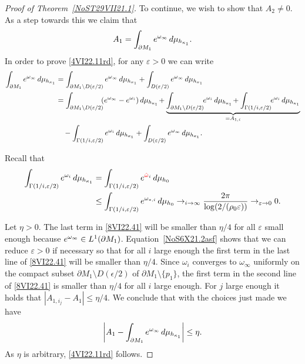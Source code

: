 \documentclass[10pt,a4paper]{article}
\numberwithin{equation}{section}
\newcommand{\hmv}{\red{\hat \omega}}
\newcommand{\mv}{\omega}%
\newcommand{\red}[1]{{\color{red}#1}}
\newcommand{\repsilon}{ {\varepsilon}}
\begin{document}
\begin{proof}[Proof of Theorem~\ref{NoST29VII21.1}]
To continue, we wish to show that $A_2\ne 0$. As a step towards this we claim that
\begin{equation}\label{4VI22.11rd}
 A_1 = \int_{\partial M_1} {\rm e}^{\mv_\infty}\, {\rm d}\mu_{h_{\kappa_1} }.
\end{equation}
In order to prove \eqref{4VI22.11rd}, for any $\repsilon>0$ we can write
\begin{align}
 \int_{\partial M_1} {\rm e}^{\mv_\infty}\, {\rm d}\mu_{h_{\kappa_1} }
 &=
 \int_{\partial M_1\setminus D(\repsilon/2)} {\rm e}^{\mv_\infty}\, {\rm d}\mu_{h_{\kappa_1} }
 +
 \int_{ D(\repsilon/2)} {\rm e}^{\mv_\infty} \,{\rm d}\mu_{h_{\kappa_1} }
 \nonumber
\\
 &=
 \int_{\partial M_1\setminus D(\repsilon/2)}\!\! ( {\rm e}^{\mv_\infty} - {\rm e}^{\mv_i} )\, {\rm d}\mu_{h_{\kappa_1} }\!
 +
 \underbrace{
 \int_{\partial M_1\setminus D(\repsilon/2)}\!\! {\rm e}^{\mv_i}\, {\rm d}\mu_{h_{\kappa_1} }\!
 +
 \int_{\Gamma(1/i,\repsilon/2) }\!\! {\rm e}^{\mv_i}\, {\rm d}\mu_{h_{\kappa_1}}
 }_{=A_{1,i}}
 \nonumber
\\
&\quad{}
 -
 \int_{\Gamma(1/i,\repsilon/2) } {\rm e}^{\mv_i}\, {\rm d}\mu_{h_{\kappa_1}}
 +
 \int_{ D(\repsilon/2)} {\rm e}^{\mv_\infty}\, {\rm d}\mu_{h_{\kappa_1} }. \label{8VI22.41}
\end{align}

Recall that
\begin{align}
 \int_{\Gamma(1/i,\repsilon/2) } {\rm e}^{\mv_i}\, {\rm d}\mu_{h_{\kappa_1}}
 & =
 \int_{\Gamma(1/i,\repsilon/2) } {\rm e}^{\hmv_i}\, {\rm d}\mu_{h_0}
\nonumber
\\
 &\le
 \int_{\Gamma(1/i,\repsilon/2) } {\rm e}^{\mv_{*,i} } \,{\rm d}\mu_{h_0}
 \to_{i\to\infty}
 \frac{2\pi }{\log (2/(\rho_0\repsilon))}
 \to_{\repsilon\to 0}
 0. \label{NoS6X21.2asf}
\end{align}

Let $\eta>0$. The last term in \eqref{8VI22.41} will be smaller than $\eta/4$ for all $\varepsilon$ small enough because ${\rm e}^{\omega_\infty}\in L^1(\partial M_1)$. Equation~\eqref{NoS6X21.2asf} shows that we can reduce $\varepsilon >0$ if necessary so that for all $i$ large enough the first term in the last line of \eqref{8VI22.41} will be smaller than $\eta/4$. Since $\omega_i $ converges to $\omega_\infty$ uniformly on the compact subset $\partial M_1\setminus D(\epsilon/2)$ of $\partial M_1\setminus \{p_1\}$, the first term in the second line of \eqref{8VI22.41} is smaller than $\eta/4$ for all $i$ large enough. For $j$ large enough it holds that $|A_{1,i_j} - A_1| \le \eta/4$.
We conclude that with the choices just made we have
\begin{equation*}%
 \left|A_1 - \int_{\partial M_1} {\rm e}^{\mv_\infty}\, {\rm d}\mu_{h_{\kappa_1} }\right| \le \eta.
\end{equation*}
As $\eta$ is arbitrary, \eqref{4VI22.11rd} follows.


\end{proof}
\end{document}
